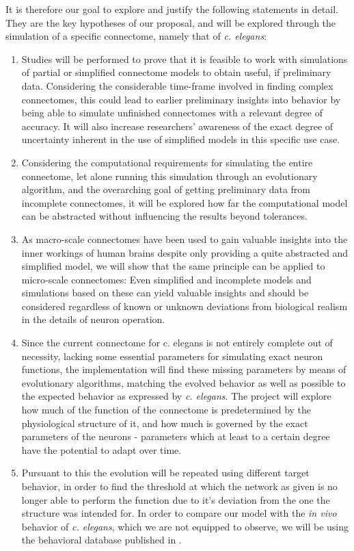 \documentclass[a4paper,11pt]{article}
\begin{document}
It is therefore our goal to explore and justify the following statements in detail. They are the key hypotheses of our proposal, and will be explored through the simulation of a specific connectome, namely that of \emph{c. elegans}:
\begin{enumerate}
\item Studies will be performed to prove that it is feasible to work with simulations of partial or simplified connectome models to obtain useful, if preliminary data. Considering the considerable time-frame involved in finding complex connectomes, this could lead to earlier preliminary insights into behavior by being able to simulate unfinished connectomes with a relevant degree of accuracy. It will also increase researchers' awareness of the exact degree of uncertainty inherent in the use of simplified models in this specific use case.
\item Considering the computational requirements for simulating the entire connectome, let alone running this simulation through an evolutionary algorithm, and the overarching goal of getting preliminary data from incomplete connectomes, it will be explored how far the computational model can be abstracted without influencing the results beyond tolerances.
\item As macro-scale connectomes have been used to gain valuable insights into the inner workings of human brains despite only providing a quite abstracted and simplified model, we will show that the same principle can be applied to micro-scale connectomes: Even simplified and incomplete models and simulations based on these can yield valuable insights and should be considered regardless of known or unknown deviations from biological realism in the details of neuron operation.
\item Since the current connectome for c. elegans is not entirely complete out of necessity, lacking some essential parameters for simulating exact neuron functions, the implementation will find these missing parameters by means of evolutionary algorithms, matching the evolved behavior as well as possible to the expected behavior as expressed by \emph{c. elegans}. The project will explore how much of the function of the connectome is predetermined by the physiological structure of it, and how much is governed by the exact parameters of the neurons - parameters which at least to a certain degree have the potential to adapt over time.
\item Pursuant to this the evolution will be repeated using different target behavior, in order to find the threshold at which the network as given is no longer able to perform the function due to it's deviation from the one the structure was intended for. In order to compare our model with the \emph{in vivo} behavior of \emph{c. elegans}, which we are not equipped to observe, we will be using the behavioral database published in \citep{yemini2013database}.

\end{enumerate}
\end{document}
